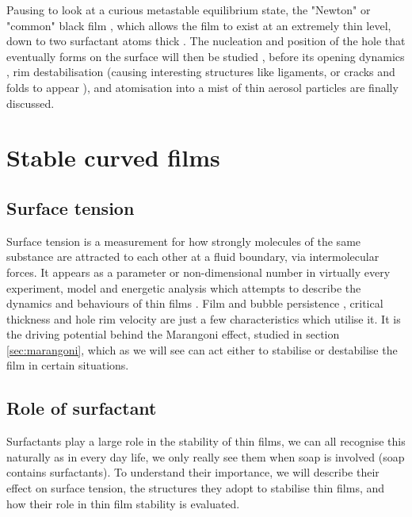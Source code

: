 \documentclass[a4paper,12pt]{article}
\numberwithin{equation}{section}
\numberwithin{figure}{section}
\numberwithin{table}{section}
\begin{document}
Pausing to look at a curious metastable equilibrium state, the "Newton" or "common" black film \cite{Seung2006}, which allows the film to exist at an extremely thin level, down to two surfactant atoms thick \cite{Casteletto2003}. The nucleation and position of the hole that eventually forms on the surface will then be studied \cite{ChampougnyNotBare2016, Debregeas1998}, before its opening dynamics \cite{Culick1960}, rim destabilisation (causing interesting structures like ligaments, or cracks and folds to appear \cite{Bico2015, Lhuissier2009}), and atomisation into a mist of thin aerosol particles \cite{Modini2013} are finally discussed.

\newpage
\section{Stable curved films}
\subsection{Surface tension}
Surface tension is a measurement for how strongly molecules of the same substance are attracted to each other at a fluid boundary, via intermolecular forces. It appears as a parameter or non-dimensional number in virtually every experiment, model and energetic analysis which attempts to describe the dynamics and behaviours of thin films \cite{Ida1998}. Film and bubble persistence \cite{Modini2013}, critical thickness \cite{Manev1974, Lhuissier2011} and hole rim velocity \cite{Culick1960} are just a few characteristics which utilise it. It is the driving potential behind the Marangoni effect, studied in section \ref{sec:marangoni}, which as we will see can act either to stabilise or destabilise the film in certain situations.


\subsection{Role of surfactant}
Surfactants play a large role in the stability of thin films, we can all recognise this naturally as in every day life, we only really see them when soap is involved (soap contains surfactants). To understand their importance, we will describe their effect on surface tension, the structures they adopt to stabilise thin films, and how their role in thin film stability is evaluated.
\end{document}
